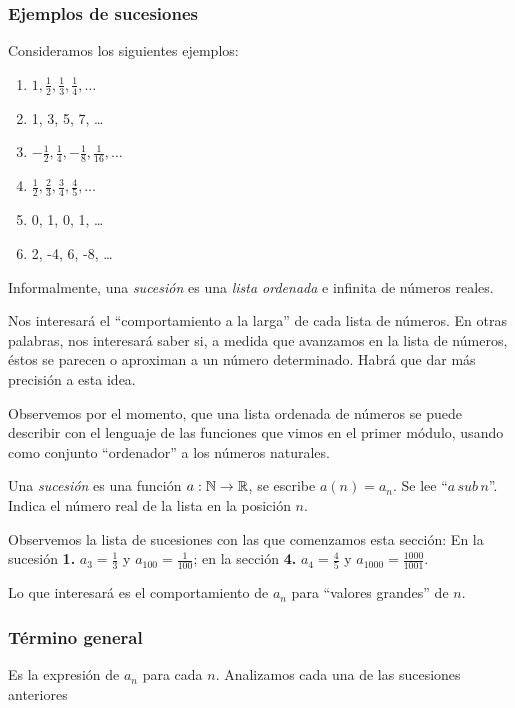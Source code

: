 \documentclass[../teoria.root.tex]{subfiles}
\begin{document}
\subsubsection{Ejemplos de sucesiones}
Consideramos los siguientes ejemplos:
\begin{enumerate}
	\item \(1,\frac{1}{2},\frac{1}{3},\frac{1}{4},\dots\)
	\item 1, 3, 5, 7, \dots
	\item \(-\frac{1}{2},\frac{1}{4},-\frac{1}{8},\frac{1}{16},\dots\)
	\item \(\frac{1}{2},\frac{2}{3},\frac{3}{4},\frac{4}{5},\dots\)
	\item 0, 1, 0, 1, \dots
	\item 2, -4, 6, -8, \dots
\end{enumerate}
Informalmente, una \textit{sucesión} es una \textit{lista ordenada} e infinita de números reales.

Nos interesará el “comportamiento a la larga” de cada lista de números.
En otras palabras, nos interesará saber si, a medida que avanzamos en la lista de números, éstos se parecen o aproximan a un número determinado.
Habrá que dar más precisión a esta idea.

Observemos por el momento, que una lista ordenada de números se puede describir con el lenguaje de las funciones que vimos en el primer módulo, usando como conjunto “ordenador” a los números naturales.

Una \textit{sucesión} es una función \(a:\mathbb{N}\rightarrow\mathbb{R}\), se escribe \(a(n)=a_n\).
Se lee “\(a\,sub\,n\)”.
Indica el número real de la lista en la posición \(n\).

Observemos la lista de sucesiones con las que comenzamos esta sección:
En la sucesión \textbf{1.} \(a_3=\frac{1}{3}\) y \(a_{100}=\frac{1}{100}\); en la sección \textbf{4.} \(a_4=\frac{4}{5}\) y \(a_{1000}=\frac{1000}{1001}\).

Lo que interesará es el comportamiento de \(a_n\) para “valores grandes” de \(n\).
\subsubsection{Término general}
Es la expresión de \(a_n\) para cada \(n\).
Analizamos cada una de las sucesiones anteriores
\end{document}
